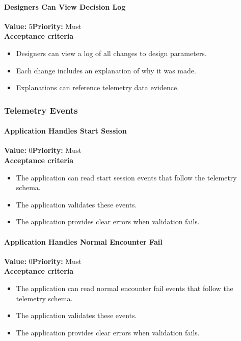 \paragraph{Designers Can View Decision Log}
\textbf{Value:} 5\quad \textbf{Priority:} Must\\
\textbf{Acceptance criteria}
\begin{itemize}
  \item Designers can view a log of all changes to design parameters.
  \item Each change includes an explanation of why it was made.
  \item Explanations can reference telemetry data evidence.
\end{itemize}

\subsubsection{Telemetry Events}

\paragraph{Application Handles Start Session}
\textbf{Value:} 0\quad \textbf{Priority:} Must\\
\textbf{Acceptance criteria}
\begin{itemize}
  \item The application can read start session events that follow the telemetry schema.
  \item The application validates these events.
  \item The application provides clear errors when validation fails.
\end{itemize}

\paragraph{Application Handles Normal Encounter Fail}
\textbf{Value:} 0\quad \textbf{Priority:} Must\\
\textbf{Acceptance criteria}
\begin{itemize}
  \item The application can read normal encounter fail events that follow the telemetry schema.
  \item The application validates these events.
  \item The application provides clear errors when validation fails.
\end{itemize}

